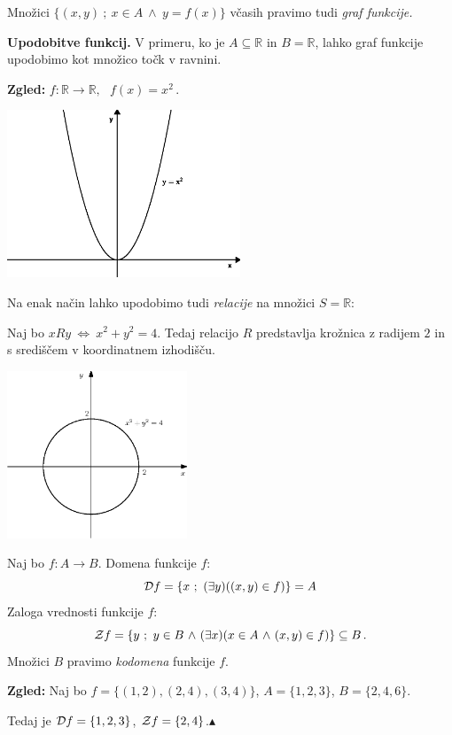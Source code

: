 \documentclass[11pt,paper=b5,footinclude,headinclude]{scrbook} %
\def\inn {{~\wedge~}}
\def\cee {{~\Leftrightarrow~}}
\def\zgled{\noindent\textbf{\color{blue} Zgled: }}
\def\kz{{\hfill{\color{blue}$\blacktriangle$}}}%
\begin{document}
\bigskip
Množici $\{(x,y)~;~x\in A\inn y = f(x)\}$ včasih pravimo tudi {\em graf funkcije.}

\bigskip
\textbf{ Upodobitve funkcij.}
V primeru, ko je $A\subseteq \mathbb{R}$ in $B = \mathbb{R}$, lahko graf funkcije upodobimo kot množico točk v ravnini.

\textbf{ Zgled:} $f:\mathbb{R}\to \mathbb{R},~~~f(x) = x^2\,.$
\begin{center}
\includegraphics[height=50mm]{f.eps}
\end{center}

\medskip

Na enak način lahko upodobimo tudi {\em relacije} na množici  $S =\mathbb{R}$:

Naj bo $xRy \cee x^2+y^2 = 4$.
Tedaj relacijo $R$ predstavlja krožnica z radijem $2$ in s središčem v koordinatnem izhodišču.

\begin{center}
\includegraphics[height=50mm]{x2+y2=4.eps}
\end{center}

\bigskip
Naj bo $f:A\to B$. Domena funkcije $f$:
$${\cal D}f = \{x~;~(\exists y)((x,y)\in f)\} = A$$
Zaloga vrednosti funkcije $f$:
$${\cal Z}f = \{y~;~y\in B\inn (\exists x)(x\in A\inn (x,y)\in f)\} \subseteq B\,.$$
Množici $B$ pravimo \emph{ kodomena} funkcije $f$.

\medskip
\zgled
Naj bo $f = \{(1,2),(2,4),(3,4)\}$, $A = \{1,2,3\}$, $B = \{2,4,6\}$.

Tedaj je ${\cal D}f = \{1,2,3\}$, ${\cal Z}f = \{2,4\}$.\kz
\end{document}
